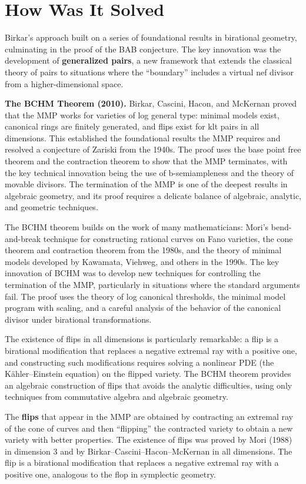 \section{How Was It Solved}

Birkar's approach built on a series of foundational results in birational geometry, culminating in the proof of the BAB conjecture. The key innovation was the development of \textbf{generalized pairs}, a new framework that extends the classical theory of pairs to situations where the ``boundary'' includes a virtual nef divisor from a higher-dimensional space.

\textbf{The BCHM Theorem (2010).} Birkar, Cascini, Hacon, and McKernan proved that the MMP works for varieties of log general type: minimal models exist, canonical rings are finitely generated, and flips exist for klt pairs in all dimensions. This established the foundational results the MMP requires and resolved a conjecture of Zariski from the 1940s. The proof uses the base point free theorem and the contraction theorem to show that the MMP terminates, with the key technical innovation being the use of b-semiampleness and the theory of movable divisors. The termination of the MMP is one of the deepest results in algebraic geometry, and its proof requires a delicate balance of algebraic, analytic, and geometric techniques.

The BCHM theorem builds on the work of many mathematicians: Mori's bend-and-break technique for constructing rational curves on Fano varieties, the cone theorem and contraction theorem from the 1980s, and the theory of minimal models developed by Kawamata, Viehweg, and others in the 1990s. The key innovation of BCHM was to develop new techniques for controlling the termination of the MMP, particularly in situations where the standard arguments fail. The proof uses the theory of log canonical thresholds, the minimal model program with scaling, and a careful analysis of the behavior of the canonical divisor under birational transformations.

The existence of flips in all dimensions is particularly remarkable: a flip is a birational modification that replaces a negative extremal ray with a positive one, and constructing such modifications requires solving a nonlinear PDE (the K\"ahler--Einstein equation) on the flipped variety. The BCHM theorem provides an algebraic construction of flips that avoids the analytic difficulties, using only techniques from commutative algebra and algebraic geometry.

The \textbf{flips} that appear in the MMP are obtained by contracting an extremal ray of the cone of curves and then ``flipping'' the contracted variety to obtain a new variety with better properties. The existence of flips was proved by Mori (1988) in dimension 3 and by Birkar--Cascini--Hacon--McKernan in all dimensions. The flip is a birational modification that replaces a negative extremal ray with a positive one, analogous to the flop in symplectic geometry.

